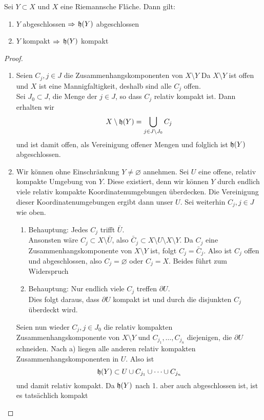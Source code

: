 \begin{thm}
  Sei $Y \subset X$ und $X$ eine Riemannsche Fläche. Dann gilt:
  \begin{enumerate}
  \item $Y$ abgeschlossen $\Rightarrow$ $\mathfrak{h}(Y)$ abgeschlossen
  \item $Y$ kompakt $\Rightarrow$ $\mathfrak{h}(Y)$ kompakt
  \end{enumerate}
\end{thm}

\begin{proof}
  \begin{enumerate}
  \item Seien $C_j, j \in J$ die Zusammenhangskomponenten von $X
    \setminus Y$ Da $X \setminus Y$ ist offen und $X$ ist eine
    Mannigfaltigkeit, deshalb sind alle $C_j$ offen. \\
    Sei $J_0 \subset J$, die Menge der $j \in J$, so dass $C_j$
    relativ kompakt ist. Dann erhalten wir
    \[
    X \setminus \mathfrak{h}(Y) = \bigcup_{j \in J\setminus J_0} C_j
    \]
    und ist damit offen, als Vereinigung offener Mengen und folglich
    ist $\mathfrak{h}(Y)$ abgeschlossen.
  \item Wir können ohne Einschränkung $Y \neq \varnothing$
    annehmen. Sei $U$ eine offene, relativ kompakte Umgebung von
    $Y$. Diese existiert, denn wir können $Y$ durch endlich viele
    relativ kompakte Koordinatenumgebungen überdecken. Die Vereinigung
    dieser Koordinatenumgebungen ergibt dann unser $U$. Sei weiterhin
    $C_j, j\in J$ wie oben.
    \begin{enumerate}
    \item Behauptung: Jedes $C_j$ trifft $\bar U$. \\
      Ansonsten wäre $C_j \subset X \setminus \bar U$, also $\bar C_j
      \subset X \setminus U \setminus X \setminus Y$. Da $C_j$ eine
      Zusammenhangskomponente von $X \setminus Y$ ist, folgt $C_j =
      \bar C_j$. Also ist $C_j$ offen und abgeschlossen, also $C_j =
      \varnothing$ oder $C_j = X$. Beides führt zum Widerspruch
    \item Behauptung: Nur endlich viele $C_j$ treffen $\partial U$. \\
      Dies folgt daraus, dass $\partial U$ kompakt ist und durch die
      disjunkten $C_j$ überdeckt wird.
    \end{enumerate}
    Seien nun wieder $C_j, j \in J_0$ die relativ kompakten
    Zusammenhangskomponente von $X \setminus Y$ und $C_{j_1}, \dots,
    C_{j_n}$ diejenigen, die $\partial U$ schneiden. Nach a)
    liegen alle anderen relativ kompakten Zusammenhangskomponenten in
    $U$. Also ist
    \[
    \mathfrak{h}(Y) \subset U \cup C_{j_1} \cup \dots \cup C_{j_n}
    \]
    und damit relativ kompakt. Da $\mathfrak{h}(Y)$ nach 1. aber auch
    abgeschlossen ist, ist es tatsächlich kompakt
  \end{enumerate}
\end{proof}


